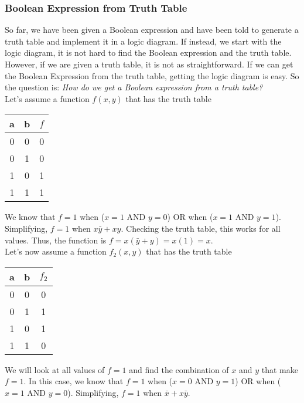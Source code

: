 \documentclass[]{article}
\begin{document}
\subsubsection{Boolean Expression from Truth Table}

So far, we have been given a Boolean expression and have been told to generate a truth table and implement it in a logic diagram. If instead, we start with the logic diagram, it is not hard to find the Boolean expression and the truth table. However, if we are given a truth table, it is not as straightforward. If we can get the Boolean Expression from the truth table, getting the logic diagram is easy. So the question is: \textit{How do we get a Boolean expression from a truth table?}\\

Let's assume a function $f(x, y)$ that has the truth table

\begin{center}
	\begin{tabular}{|c|c|c|}
		a & b & $f$ \\\hline
		0 & 0 & 0 \\
		0 & 1 & 0 \\
		1 & 0 & 1 \\
		1 & 1 & 1 \\
	\end{tabular}
	\bigbreak
\end{center}

We know that $f=1$ when ($x=1$ AND $y=0$) OR when ($x=1$ AND $y=1$). Simplifying, $f=1$ when $x\bar{y} + xy$. Checking the truth table, this works for all values. Thus, the function is $f = x(\bar{y} + y) = x(1) = x$.\\

Let's now assume a function $f_2(x, y)$ that has the truth table

\begin{center}
	\begin{tabular}{|c|c|c|}
		a & b & $f_2$ \\\hline
		0 & 0 & 0 \\
		0 & 1 & 1 \\
		1 & 0 & 1 \\
		1 & 1 & 0 \\
	\end{tabular}
	\bigbreak
\end{center}

We will look at all values of $f=1$ and find the combination of $x$ and $y$ that make $f=1$. In this case, we know that $f=1$ when ($x=0$ AND $y=1$) OR when ($x=1$ AND $y=0$). Simplifying, $f=1$ when $\bar{x} + x\bar{y}$.\\
\end{document}
